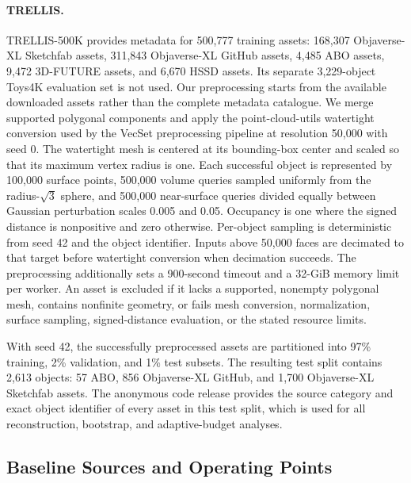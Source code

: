 \paragraph{TRELLIS.}
TRELLIS-500K \citep{xiang2025structured} provides metadata for 500,777
training assets: 168,307 Objaverse-XL Sketchfab assets, 311,843 Objaverse-XL
GitHub assets, 4,485 ABO assets, 9,472 3D-FUTURE assets, and 6,670 HSSD assets.
Its separate 3,229-object Toys4K evaluation set is not used.  Our preprocessing
starts from the available downloaded assets rather than the complete metadata
catalogue.  We merge supported polygonal components and apply the
point-cloud-utils watertight conversion used by the VecSet preprocessing
pipeline at resolution 50,000 with seed 0.  The watertight mesh is centered at
its bounding-box center and scaled so that its maximum vertex radius is one.
Each successful object is represented by 100,000 surface points, 500,000
volume queries sampled uniformly from the radius-$\sqrt{3}$ sphere, and
500,000 near-surface queries divided equally between Gaussian perturbation
scales 0.005 and 0.05. Occupancy is one where the signed distance is
nonpositive and zero otherwise.
Per-object sampling is deterministic from seed 42 and the object identifier.
Inputs above 50,000 faces are decimated to that target before watertight
conversion when decimation succeeds. The preprocessing additionally sets a
900-second timeout and a 32-GiB memory limit per worker. An asset is excluded
if it lacks a supported,
nonempty polygonal mesh, contains nonfinite geometry, or fails mesh conversion,
normalization, surface sampling, signed-distance evaluation, or the stated
resource limits.

With seed 42, the successfully preprocessed assets are partitioned into 97\%
training, 2\% validation, and 1\% test subsets. The resulting test split
contains 2,613 objects: 57 ABO, 856 Objaverse-XL GitHub, and 1,700
Objaverse-XL Sketchfab assets. The anonymous code release provides the source
category and exact object identifier of every asset in this test split, which
is used for all reconstruction, bootstrap, and adaptive-budget analyses.

\subsection{Baseline Sources and Operating Points}

